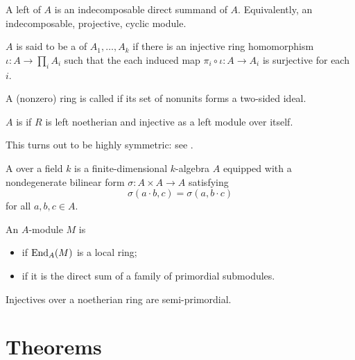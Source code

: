 \documentclass[12pt]{article}
\begin{document}
\begin{defn}
	A left  of $A$ is an indecomposable direct summand of $A$. 
	Equivalently, an indecomposable, projective, cyclic module.
\end{defn}

\begin{defn} \label{defn:subdirect-product}
	$A$ is said to be a  of $A_{1}, \ldots, A_{k}$  if 
	there is an injective ring homomorphism $\iota \colon A \to \prod_{i} A_{i}$ such that 
	the each induced map $\pi_{i} \circ \iota \colon A \to A_{i}$ is surjective for each $i$.
\end{defn}

\begin{defn}
	A (nonzero) ring is called  if its set of nonunits forms a two-sided ideal.
\end{defn}

\begin{defn}
	$A$ is  if $R$ is left noetherian and injective as a left module over itself.
\end{defn}
This turns out to be highly symmetric: see .

\begin{defn}
	A  over a field $k$ is a finite-dimensional $k$-algebra $A$ equipped with 
	a nondegenerate bilinear form $\sigma \colon A \times A \to A$ satisfying
	\begin{equation*} 
		\sigma(a \cdot b, c) = \sigma(a, b \cdot c)
	\end{equation*}
	for all $a, b, c \in A$.
\end{defn}

\begin{defn}
	An $A$-module $M$ is 
	\begin{itemize}
		\item {} if $\operatorname{End}_{A}(M)$ is a local ring;
		\item {} if it is the direct sum of a family of primordial submodules.
	\end{itemize}
\end{defn}
Injectives over a noetherian ring are semi-primordial.

\part{Theorems} \label{part:theorems}
\end{document}
